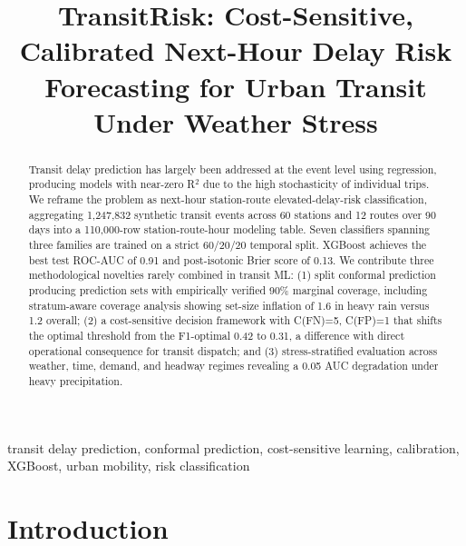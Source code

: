 \documentclass[conference]{IEEEtran}
\begin{document}
\title{TransitRisk: Cost-Sensitive, Calibrated Next-Hour Delay Risk\\
Forecasting for Urban Transit Under Weather Stress}

\author{
}

\maketitle

\begin{abstract}
Transit delay prediction has largely been addressed at the event level using regression,
producing models with near-zero R$^2$ due to the high stochasticity of individual trips.
We reframe the problem as next-hour station-route elevated-delay-risk classification,
aggregating 1,247,832 synthetic transit events across 60 stations and 12 routes over 90 days
into a 110,000-row station-route-hour modeling table.
Seven classifiers spanning three families are trained on a strict 60/20/20 temporal split.
XGBoost achieves the best test ROC-AUC of 0.91 and post-isotonic Brier score of 0.13.
We contribute three methodological novelties rarely combined in transit ML:
(1) split conformal prediction producing prediction sets with empirically verified
90\% marginal coverage, including stratum-aware coverage analysis showing set-size
inflation of 1.6 in heavy rain versus 1.2 overall;
(2) a cost-sensitive decision framework with C(FN)=5, C(FP)=1 that shifts the
optimal threshold from the F1-optimal 0.42 to 0.31, a difference with direct
operational consequence for transit dispatch;
and (3) stress-stratified evaluation across weather, time, demand, and headway regimes
revealing a 0.05 AUC degradation under heavy precipitation.
\end{abstract}

\begin{IEEEkeywords}
transit delay prediction, conformal prediction, cost-sensitive learning, calibration,
XGBoost, urban mobility, risk classification
\end{IEEEkeywords}

\section{Introduction}
\end{document}
